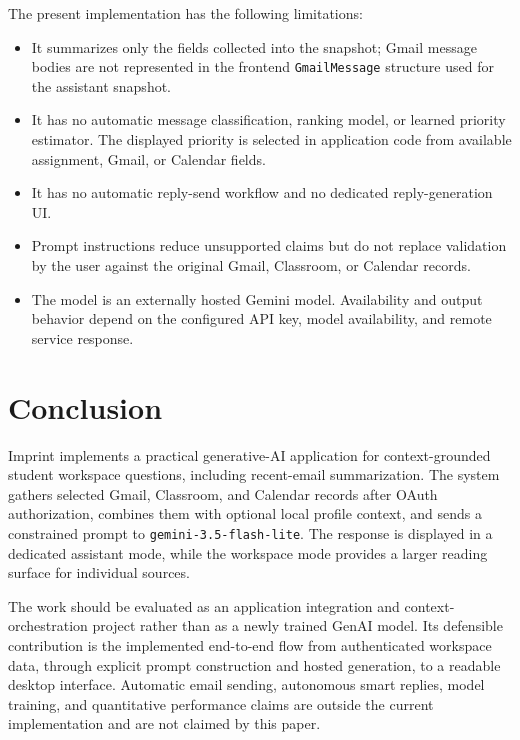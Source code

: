 \documentclass[conference]{IEEEtran}
\begin{document}
The present implementation has the following limitations:

\begin{itemize}
    \item It summarizes only the fields collected into the snapshot; Gmail message bodies are not represented in the frontend \texttt{GmailMessage} structure used for the assistant snapshot.
    \item It has no automatic message classification, ranking model, or learned priority estimator. The displayed priority is selected in application code from available assignment, Gmail, or Calendar fields.
    \item It has no automatic reply-send workflow and no dedicated reply-generation UI.
    \item Prompt instructions reduce unsupported claims but do not replace validation by the user against the original Gmail, Classroom, or Calendar records.
    \item The model is an externally hosted Gemini model. Availability and output behavior depend on the configured API key, model availability, and remote service response.
\end{itemize}

\section{Conclusion}

Imprint implements a practical generative-AI application for context-grounded student workspace questions, including recent-email summarization. The system gathers selected Gmail, Classroom, and Calendar records after OAuth authorization, combines them with optional local profile context, and sends a constrained prompt to \texttt{gemini-3.5-flash-lite}. The response is displayed in a dedicated assistant mode, while the workspace mode provides a larger reading surface for individual sources.

The work should be evaluated as an application integration and context-orchestration project rather than as a newly trained GenAI model. Its defensible contribution is the implemented end-to-end flow from authenticated workspace data, through explicit prompt construction and hosted generation, to a readable desktop interface. Automatic email sending, autonomous smart replies, model training, and quantitative performance claims are outside the current implementation and are not claimed by this paper.
\end{document}
